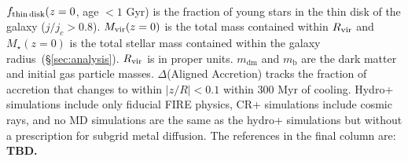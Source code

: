 \documentclass[fleqn,usenatbib]{mnras}
\begin{document}
\begin{table}
\begin{tabular}{cccccccc}
\hline
\end{tabular}
\\
\begin{flushleft}
$f_{\rm thin\,disk}(z=0$, age $<1$ Gyr) is the fraction of young stars in the thin disk of the galaxy ($j/j_c > 0.8$).
$M_{\rm vir}(z=0)$ is the total mass contained within $R_{\rm vir}$ and $M_\star(z=0)$ is the total stellar mass contained within the galaxy radius~(\S\ref{sec:analysis}). 
$R_{\rm vir}$ is in proper units.
$m_{\textrm{dm}}$ and $m_\textrm{b}$ are the dark matter and initial gas particle masses.
$\Delta$(Aligned Accretion) tracks the fraction of accretion that changes to within $\vert z/R \vert <0.1$ within 300 Myr of cooling.
Hydro+ simulations include only fiducial FIRE physics, CR+ simulations include cosmic rays, and no MD simulations are the same as the hydro+ simulations but without a prescription for subgrid metal diffusion.
The references in the final column are:
\textbf{TBD.}
\end{flushleft}
\label{table: simulations_used}
\end{table}

\end{document}
